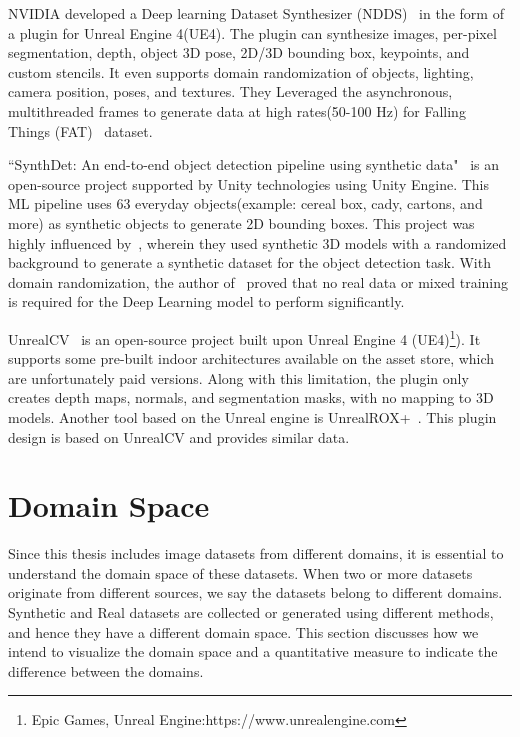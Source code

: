NVIDIA developed a Deep learning Dataset Synthesizer (NDDS)~\cite{to2018ndds} in the form of a plugin for Unreal Engine 4(UE4).
The plugin can synthesize images, per-pixel segmentation, depth, object 3D pose, 2D/3D bounding box, keypoints, and custom stencils.
It even supports domain randomization of objects, lighting, camera position, poses, and textures.
They Leveraged the asynchronous, multithreaded frames to generate data at high rates(50-100 Hz) for Falling Things (FAT)~\cite{Tremblay2018} dataset.

``SynthDet: An end-to-end object detection pipeline using synthetic data"~\cite{synthdet2020} is an open-source project supported by Unity technologies using Unity Engine.
This ML pipeline uses 63 everyday objects(example: cereal box, cady, cartons, and more) as synthetic objects to generate 2D bounding boxes.
This project was highly influenced by~\cite{hinterstoisser2019annotation}, wherein they used synthetic 3D models with a randomized background to generate a synthetic dataset for the object detection task.
With domain randomization, the author of~\cite{hinterstoisser2019annotation} proved that no real data or mixed training is required for the Deep Learning model to perform significantly.

UnrealCV~\cite{Qiu2017} is an open-source project built upon Unreal Engine 4 (UE4)\footnote{Epic Games, Unreal Engine:https://www.unrealengine.com}).
It supports some pre-built indoor architectures available on the asset store, which are unfortunately paid versions.
Along with this limitation, the plugin only creates depth maps, normals, and segmentation masks, with no mapping to 3D models.
Another tool based on the Unreal engine is UnrealROX+~\cite{martinezgonzalez2021unrealrox}.
This plugin design is based on UnrealCV and provides similar data.

\section{Domain Space}\label{sec:domain-space}

Since this thesis includes image datasets from different domains, it is essential to understand the domain space of these datasets.
When two or more datasets originate from different sources, we say the datasets belong to different domains.
Synthetic and Real datasets are collected or generated using different methods, and hence they have a different domain space.
This section discusses how we intend to visualize the domain space and a quantitative measure to indicate the difference between the domains.

